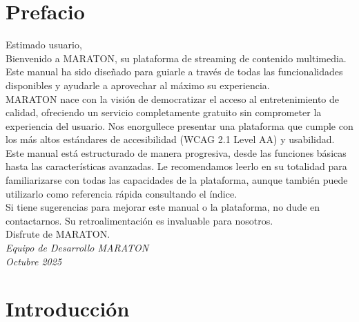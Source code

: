 \documentclass[11pt,a4paper,twoside]{book}
\begin{document}
\vspace*{\fill}
\newpage

\tableofcontents
\newpage

\chapter*{Prefacio}

Estimado usuario,\\[0.5cm]

Bienvenido a MARATON, su plataforma de streaming de contenido multimedia. Este manual ha sido diseñado para guiarle a través de todas las funcionalidades disponibles y ayudarle a aprovechar al máximo su experiencia.\\[0.5cm]

MARATON nace con la visión de democratizar el acceso al entretenimiento de calidad, ofreciendo un servicio completamente gratuito sin comprometer la experiencia del usuario. Nos enorgullece presentar una plataforma que cumple con los más altos estándares de accesibilidad (WCAG 2.1 Level AA) y usabilidad.\\[0.5cm]

Este manual está estructurado de manera progresiva, desde las funciones básicas hasta las características avanzadas. Le recomendamos leerlo en su totalidad para familiarizarse con todas las capacidades de la plataforma, aunque también puede utilizarlo como referencia rápida consultando el índice.\\[0.5cm]

Si tiene sugerencias para mejorar este manual o la plataforma, no dude en contactarnos. Su retroalimentación es invaluable para nosotros.\\[0.5cm]

Disfrute de MARATON.\\[1cm]

\noindent
\textit{Equipo de Desarrollo MARATON}\\
\textit{Octubre 2025}

\newpage

\chapter{Introducción}
\end{document}
